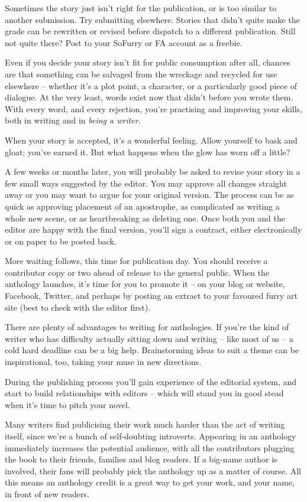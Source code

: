Sometimes the story just isn't right for the publication, or is too similar to another submission. Try submitting elsewhere. Stories that didn't quite make the grade can be rewritten or revised before dispatch to a different publication. Still not quite there? Post to your SoFurry or FA account as a freebie.

Even if you decide your story isn't fit for public consumption after all, chances are that something can be salvaged from the wreckage and recycled for use elsewhere – whether it's a plot point, a character, or a particularly good piece of dialogue. At the very least, words exist now that didn't before you wrote them. With every word, and every rejection, you're practising and improving your skills, both in writing and in \textit{being a writer}.

When your story is accepted, it's a wonderful feeling. Allow yourself to bask and gloat; you've earned it. But what happens when the glow has worn off a little?

A few weeks or months later, you will probably be asked to revise your story in a few small ways suggested by the editor. You may approve all changes straight away or you may want to argue for your original version. The process can be as quick as approving placement of an apostrophe, as complicated as writing a whole new scene, or as heartbreaking as deleting one. Once both you and the editor are happy with the final version, you'll sign a contract, either electronically or on paper to be posted back.

More waiting follows, this time for publication day. You should receive a contributor copy or two ahead of release to the general public. When the anthology launches, it's time for you to promote it -- on your blog or website, Facebook, Twitter, and perhaps by posting an extract to your favoured furry art site (best to check with the editor first).

There are plenty of advantages to writing for anthologies. If you're the kind of writer who has difficulty actually sitting down and writing -- like most of us -- a cold hard deadline can be a big help. Brainstorming ideas to suit a theme can be inspirational, too, taking your muse in new directions.

During the publishing process you'll gain experience of the editorial system, and start to build relationships with editors – which will stand you in good stead when it's time to pitch your novel.

Many writers find publicising their work much harder than the act of writing itself, since we're a bunch of self-doubting introverts. Appearing in an anthology immediately increases the potential audience, with all the contributors plugging the book to their friends, families and blog readers. If a big-name author is involved, their fans will probably pick the anthology up as a matter of course. All this means an anthology credit is a great way to get your work, and your name, in front of new readers.

